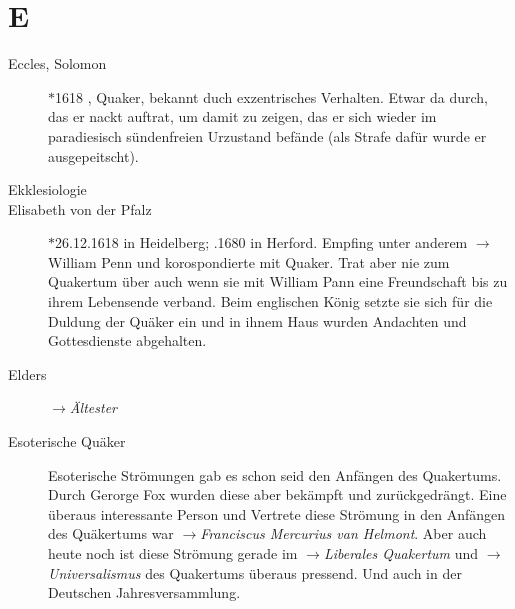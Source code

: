 \section*{E}

\articlesize

\begin{description}

 \item[Eccles, Solomon] $\ast$1618 , Quaker,  bekannt duch exzentrisches
 Verhalten. Etwar da durch, das er nackt auftrat, um damit zu zeigen, das er
 sich wieder im paradiesisch sündenfreien Urzustand befände (als Strafe dafür
 wurde er ausgepeitscht).

 \item[Ekklesiologie]



 \item[Elisabeth von der Pfalz] $\ast$26.12.1618 in Heidelberg; .1680
 in Herford. Empfing unter anderem $\to$William Penn und korospondierte mit
 Quaker. Trat aber nie zum Quakertum über auch wenn sie mit William Pann eine
 Freundschaft bis zu ihrem Lebensende verband. Beim englischen König setzte sie
 sich für die Duldung der Quäker ein und in ihnem Haus wurden Andachten und
 Gottesdienste abgehalten.

  \item[Elders] $\to$\textit{Ältester}

  \item[Esoterische Quäker] Esoterische Strömungen gab es schon seid den Anfängen
  des Quakertums. Durch Gerorge Fox wurden diese aber bekämpft und zurückgedrängt.
  Eine überaus interessante Person und Vertrete diese Strömung in den Anfängen
  des Quäkertums war $\to$\textit{Franciscus Mercurius van Helmont}. Aber auch
  heute noch ist diese Strömung gerade im $\to$\textit{Liberales Quakertum} und
  $\to$\textit{Universalismus} des Quakertums überaus pressend. Und auch in der
  Deutschen Jahresversammlung.


\end{description}
